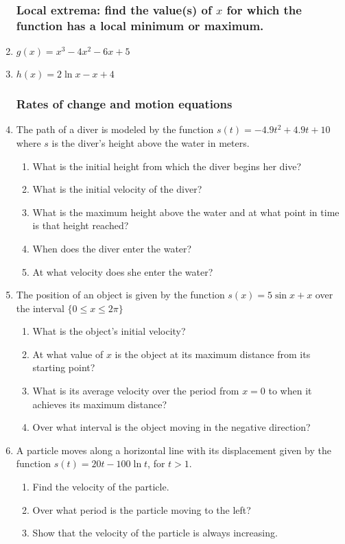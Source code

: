 \documentclass[12pt, twoside]{article}
\begin{document}
\begin{enumerate}
\subsubsection*{Local extrema: find the value(s) of $x$ for which the function has a local minimum or maximum.}
  \item $g(x) = x^3-4x^2-6x+5$
  \item $h(x) = 2\ln x - x+4$


\subsubsection*{Rates of change and motion equations}

\item The path of a diver is modeled by the function $s(t)=-4.9t^2+4.9t+10$ where $s$ is the diver's height above the water in meters.
  \begin{enumerate}
      \item What is the initial height from which the diver begins her dive?
      \item What is the initial velocity of the diver?
      \item What is the maximum height above the water and at what point in time is that height reached?
      \item When does the diver enter the water?
      \item At what velocity does she enter the water?
  \end{enumerate}

\item The position of an object is given by the function $s(x) = 5\sin x +x$ over the interval $\{0\leq x  \leq 2\pi \}$
  \begin{enumerate}
      \item What is the object's initial velocity?
      \item At what value of $x$ is the object at its maximum distance from its starting point?
      \item What is its average velocity over the period from $x=0$ to when it achieves its maximum distance?
      \item Over what interval is the object moving in the negative direction?
  \end{enumerate}


\item A particle moves along a horizontal line with its displacement given by the function $s(t) = 20t - 100 \ln{t}$, for $t>1$.
  \begin{enumerate}
      \item Find the velocity of the particle.
      \item Over what period is the particle moving to the left?
      \item Show that the velocity of the particle is always increasing.
  \end{enumerate}

\end{enumerate}
\end{document}
